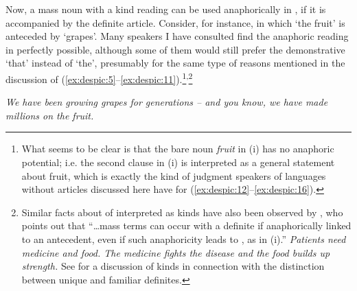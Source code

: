 \documentclass[output=paper,
modfonts
]{langscibook}
\begin{document}
	Now, a mass noun with a kind reading can be used anaphorically in , if it is accompanied
	by the definite article. Consider, for instance,  in which `the fruit' is anteceded by `grapes'.
	Many speakers I have consulted find the anaphoric reading in  perfectly possible, although
	some of them would still prefer the demonstrative `that' instead of `the', presumably for the
	same type of reasons mentioned in the discussion of (\ref{ex:despic:5}--\ref{ex:despic:11}).\footnote{What seems to be clear is that the bare noun \textit{fruit} in (i) has no anaphoric potential; i.e. the second clause in (i) is interpreted as a general statement about fruit, which is exactly the kind of judgment speakers of languages without
		articles discussed here have for (\ref{ex:despic:12}--\ref{ex:despic:16}).
		\z\vspace*{-\baselineskip}
	}\textsuperscript{,}\footnote{Similar facts about  of  interpreted as kinds have also been observed by \citet[ft. 43, 435--436]{Dayal2004}, who points out that ``\ldots mass terms can occur with a definite if anaphorically linked to an antecedent, even if such anaphoricity leads to , as in (i).''
		\ea \textit{Patients need medicine and food. {\op}The{\cp} medicine fights the disease and {\op}the{\cp} food builds up strength.}
		\label{ex:despic:n7}
		\z
		See  for a discussion of kinds in connection with the distinction between unique and familiar definites.   
	}
	
	
	\ea \label{ex:despic:17}
	\textit{We have been growing grapes for generations -- and you know, we have made millions on
		the fruit.}
	\z
	
\end{document}
